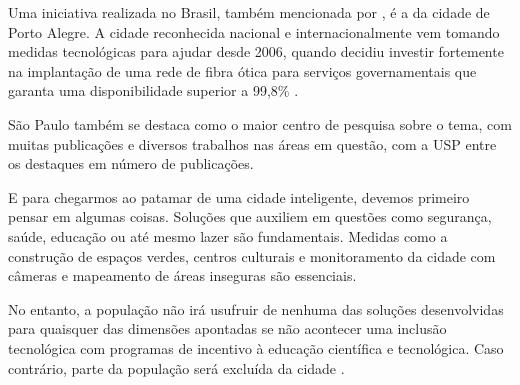 Uma iniciativa realizada no Brasil, também mencionada por , é a da cidade de Porto Alegre. A cidade reconhecida nacional e internacionalmente vem tomando medidas tecnológicas para ajudar desde 2006, quando decidiu investir fortemente na implantação de uma rede de fibra ótica para serviços governamentais que garanta uma disponibilidade superior a 99,8\% \cite{weiss}.



São Paulo também se destaca como o maior centro de pesquisa sobre o tema, com muitas publicações e diversos trabalhos nas áreas em questão, com a USP entre os destaques em número de publicações.

E para chegarmos ao patamar de uma cidade inteligente, devemos primeiro pensar em algumas coisas. Soluções que auxiliem em questões como segurança, saúde, educação ou até mesmo lazer são fundamentais. Medidas como a construção de espaços verdes, centros culturais e monitoramento da cidade com câmeras e mapeamento de áreas inseguras são essenciais.

No entanto, a população não irá usufruir de nenhuma das soluções desenvolvidas para quaisquer das dimensões apontadas se não acontecer uma inclusão tecnológica com programas de incentivo à educação científica e tecnológica. Caso contrário, parte da população será excluída da cidade \cite{patricia}.

